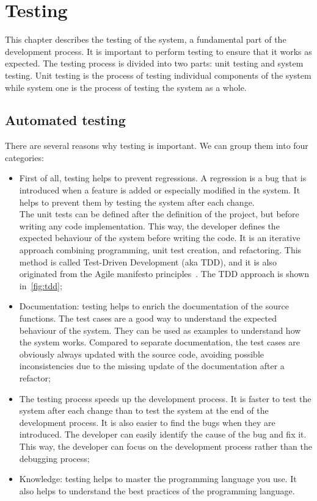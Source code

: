 \chapter{Testing}

This chapter describes the testing of the system, a fundamental part of the development process. It is important to perform testing to ensure that it works as expected. The testing process is divided into two parts: unit testing and system testing. Unit testing is the process of testing individual components of the system while system one is the process of testing the system as a whole.

\section{Automated testing}


There are several reasons why testing is important. We can group them into four categories:

\begin{itemize}
  \item
        First of all, testing helps to prevent regressions. A regression is a bug that is introduced when a feature is added or especially modified in the system. It helps to prevent them by testing the system after each change. \\
        The unit tests can be defined after the definition of the project, but before writing any code implementation. This way, the developer defines the expected behaviour of the system before writing the code. It is an iterative approach combining programming, unit test creation, and refactoring. This method is called Test-Driven Development (aka TDD), and it is also originated from the Agile manifesto principles~\cite{agile-test-driven-development}. The TDD approach is shown in~\cref{fig:tdd};
  \item
        Documentation: testing helps to enrich the documentation of the source functions. The test cases are a good way to understand the expected behaviour of the system. They can be used as examples to understand how the system works. Compared to separate documentation, the test cases are obviously always updated with the source code, avoiding possible inconsistencies due to the missing update of the documentation after a refactor;
  \item
        The testing process speeds up the development process. It is faster to test the system after each change than to test the system at the end of the development process. It is also easier to find the bugs when they are introduced. The developer can easily identify the cause of the bug and fix it. This way, the developer can focus on the development process rather than the debugging process;
  \item
        Knowledge: testing helps to master the programming language you use. It also helps to understand the best practices of the programming language.
\end{itemize}

